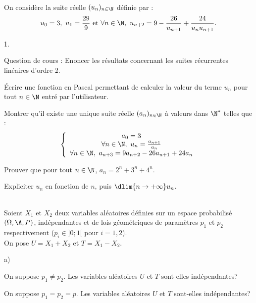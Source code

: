 \documentclass[11pt]{article}%
\begin{document}


\begin{exerciceAP}~\\
  On considère la suite réelle $(u_n)_{n \in \N}$ définie par : 
  \[
  u_0 = 3,\ u_1 = \frac{29}{9} \text{ et } \forall n \in \N,\ u_{n+2}
  = 9 - \frac{26}{u_{n+1}} + \frac{24}{u_n u_{n+1}}.
  \]
  \begin{noliste}{1.}
    \setlength{\itemsep}{2mm}
  \item Question de cours : Enoncer les résultats concernant les
    suites récurrentes linéaires d'ordre 2.

  \item Écrire une fonction en Pascal permettant de calculer la valeur
    du terme $u_n$ pour tout $n \in \N$ entré par l'utilisateur.

  \item Montrer qu'il existe une unique suite réelle $(a_n)_{n \in
      \N}$ à valeurs dans $\N^*$ telles que :
    \[
    \left\{ \begin{array}{c}
        a_0 = 3 \\
        \forall n \in \N,\ u_n = \frac{a_{n+1}}{a_n} \\
        \forall n \in \N,\ a_{n+3} = 9 a_{n+2} - 26 a_{n+1} + 24 a_n
      \end{array} 
    \right.
    \]
  \item Prouver que pour tout $n \in \N$, $a_n = 2^n + 3^n + 4^n$.
  \item Expliciter $u_n$ en fonction de $n$, puis $\dlim{n \rightarrow
      +\infty} u_n$.
  \end{noliste}
\end{exerciceAP}


\begin{exerciceSP}~\\
  Soient $X_1$ et $X_2$ deux variables aléatoires définies sur un
  espace probabilisé $(\Omega , \A , P)$, indépendantes et de lois
  géométriques de paramètres $p_1$ et $p_2$ respectivement ($p_i \in
  ]0 ; 1[$ pour $i = 1,2$). \\
  On pose $U = X_1 + X_2$ et $T = X_1 - X_2$.
  \begin{noliste}{a)}
    \setlength{\itemsep}{2mm}
  \item On suppose $p_1 \neq p_2$. Les variables aléatoires $U$ et $T$
    sont-elles indépendantes?
  \item On suppose $p_1 = p_2 = p$. Les variables aléatoires $U$ et
    $T$ sont-elles indépendantes?
  \end{noliste}
\end{exerciceSP}
\end{document}
